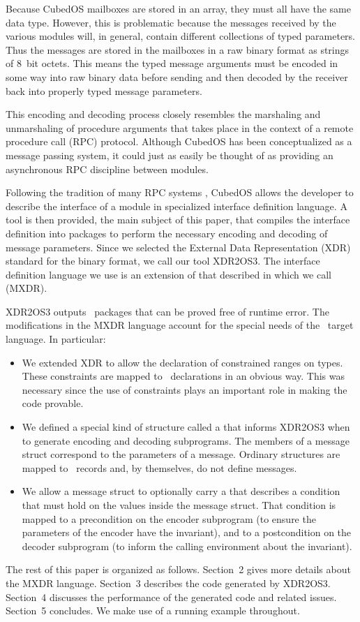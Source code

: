 Because CubedOS mailboxes are stored in an array, they must all have the same data type.
However, this is problematic because the messages received by the various modules will, in
general, contain different collections of typed parameters. Thus the messages are stored in the
mailboxes in a raw binary format as strings of 8~bit octets.  This means the typed message
arguments must be encoded in some way into raw binary data before sending and then decoded by
the receiver back into properly typed message parameters.

This encoding and decoding process closely resembles the marshaling and unmarshaling of
procedure arguments that takes place in the context of a remote procedure call (RPC) protocol.
Although CubedOS has been conceptualized as a message passing system, it could just as easily be
thought of as providing an asynchronous RPC discipline between modules.

Following the tradition of many RPC systems , CubedOS allows the
developer to describe the interface of a module in specialized interface definition language. A
tool is then provided, the main subject of this paper, that compiles the interface definition
into packages to perform the necessary encoding and decoding of message parameters. Since we
selected the External Data Representation (XDR) standard for the binary format, we call our tool
XDR2OS3. The interface definition language we use is an extension of that described in  which we call  (MXDR).

XDR2OS3 outputs \SPARK\ packages that can be proved free of runtime error. The modifications in
the MXDR language account for the special needs of the \SPARK\ target language. In particular:

\begin{itemize}
\item We extended XDR to allow the declaration of constrained ranges on types. These constraints
  are mapped to \SPARK\ declarations in an obvious way. This was necessary since the use of
  constraints plays an important role in making the code provable.

\item We defined a special kind of structure called a  that informs
  XDR2OS3 when to generate encoding and decoding subprograms. The members of a message struct
  correspond to the parameters of a message. Ordinary structures are mapped to \SPARK\ records
  and, by themselves, do not define messages.

\item We allow a message struct to optionally carry a  that describes
  a condition that must hold on the values inside the message struct. That condition is mapped
  to a precondition on the encoder subprogram (to ensure the parameters of the encoder have the
  invariant), and to a postcondition on the decoder subprogram (to inform the calling
  environment about the invariant).
\end{itemize}

The rest of this paper is organized as follows. Section~2 gives more details about the MXDR
language. Section~3 describes the code generated by XDR2OS3. Section~4 discusses the performance
of the generated code and related issues. Section~5 concludes. We make use of a running example
throughout.
